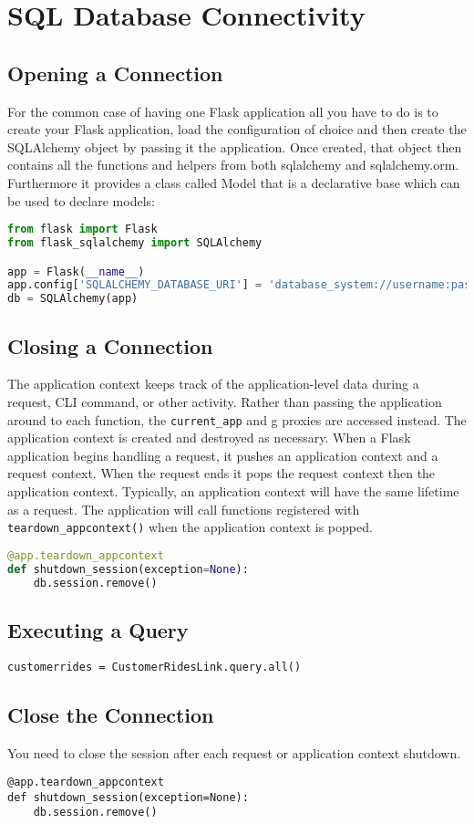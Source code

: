 \chapter{SQL Database Connectivity}

\section{Opening a Connection}
For the common case of having one Flask application all you have to do is to create your Flask application, load the configuration of choice and then create the SQLAlchemy object by passing it the application.
Once created, that object then contains all the functions and helpers from both sqlalchemy and sqlalchemy.orm. Furthermore it provides a class called Model that is a declarative base which can be used to declare models:
\begin{lstlisting}[language=Python]
from flask import Flask
from flask_sqlalchemy import SQLAlchemy

app = Flask(__name__)
app.config['SQLALCHEMY_DATABASE_URI'] = 'database_system://username:password@IPAddress:port/database_name'
db = SQLAlchemy(app)
\end{lstlisting}
\thispagestyle{fancy}

\section{Closing a Connection}
The application context keeps track of the application-level data during a request, CLI command, or other activity.
Rather than passing the application around to each function, the \texttt{current\_app} and g proxies are accessed instead.
The application context is created and destroyed as necessary. When a Flask application begins handling a request,
it pushes an application context and a request context.
When the request ends it pops the request context then the application context.
Typically, an application context will have the same lifetime as a request.
The application will call functions registered with \texttt{teardown\_appcontext()} when the application context is popped.
\begin{lstlisting}[language=Python]
@app.teardown_appcontext
def shutdown_session(exception=None):
    db.session.remove()
\end{lstlisting}
\thispagestyle{fancy}
\section{Executing a Query}
\begin{lstlisting}
customerrides = CustomerRidesLink.query.all()
\end{lstlisting}
\section{Close the Connection}
You need to close the session after each request or application context shutdown.
\begin{lstlisting}
@app.teardown_appcontext
def shutdown_session(exception=None):
    db.session.remove()
\end{lstlisting}
\thispagestyle{fancy}
